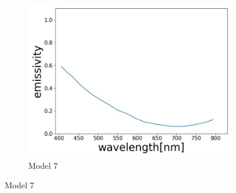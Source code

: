 \begin{figure}[htbp]
\begin{subfigure}{0.3\linewidth}
      \includegraphics[width=\linewidth]{figures/emissivity_31.jpg}
      \caption{Model 7}
      \label{fig: emi_31}
    \end{subfigure}
    
    \medskip


\end{figure}
